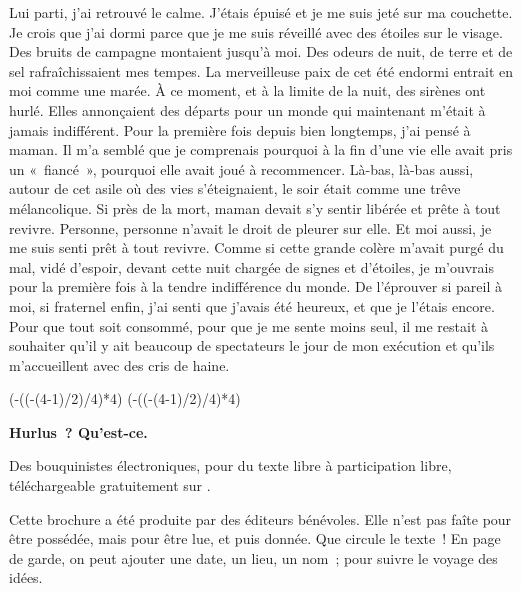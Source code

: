 \documentclass[french,twoside]{book} %
\newcommand\chapterclose{} %
\def\truncdiv#1#2{((#1-(#2-1)/2)/#2)}
\def\moduloop#1#2{(#1-\truncdiv{#1}{#2}*#2)}
\def\modulo#1#2{\number\numexpr\moduloop{#1}{#2}\relax}
\begin{document}
Lui parti, j’ai retrouvé le calme. J'étais épuisé et je me suis jeté sur ma couchette. Je crois que j’ai dormi parce que je me suis réveillé avec des étoiles sur le visage. Des bruits de campagne montaient jusqu’à moi. Des odeurs de nuit, de terre et de sel rafraîchissaient mes tempes. La merveilleuse paix de cet été endormi entrait en moi comme une marée. À ce moment, et à la limite de la nuit, des sirènes ont hurlé. Elles annonçaient des départs pour un monde qui maintenant m’était à jamais indifférent. Pour la première fois depuis bien longtemps, j’ai pensé à maman. Il m’a semblé que je comprenais pourquoi à la fin d’une vie elle avait pris un « fiancé », pourquoi elle avait joué à recommencer. Là-bas, là-bas aussi, autour de cet asile où des vies s’éteignaient, le soir était comme une trêve mélancolique. Si près de la mort, maman devait s’y sentir libérée et prête à tout revivre. Personne, personne n’avait le droit de pleurer sur elle. Et moi aussi, je me suis senti prêt à tout revivre. Comme si cette grande colère m’avait purgé du mal, vidé d’espoir, devant cette nuit chargée de signes et d’étoiles, je m’ouvrais pour la première fois à la tendre indifférence du monde. De l’éprouver si pareil à moi, si fraternel enfin, j’ai senti que j’avais été heureux, et que je l’étais encore. Pour que tout soit consommé, pour que je me sente moins seul, il me restait à souhaiter qu’il y ait beaucoup de spectateurs le jour de mon exécution et qu’ils m’accueillent avec des cris de haine.
\chapterclose

\chapterclose

 


\ifbooklet
  \pagestyle{empty}
  \clearpage
  \ifnum\modulo{\value{page}}{4}=0 \hbox{}\newpage\hbox{}\newpage\fi
  \ifnum\modulo{\value{page}}{4}=1 \hbox{}\newpage\hbox{}\newpage\fi


  \hbox{}\newpage
  \ifodd\value{page}\hbox{}\newpage\fi
  {\centering\color{rubric}\bfseries\noindent\large
    Hurlus ? Qu’est-ce.\par
    \bigskip
  }
  \noindent Des bouquinistes électroniques, pour du texte libre à participation libre,
  téléchargeable gratuitement sur \href{https://hurlus.fr}{}.\par
  \bigskip
  \noindent Cette brochure a été produite par des éditeurs bénévoles.
  Elle n’est pas faîte pour être possédée, mais pour être lue, et puis donnée.
  Que circule le texte !
  En page de garde, on peut ajouter une date, un lieu, un nom ; pour suivre le voyage des idées.
  \par
\end{document}
